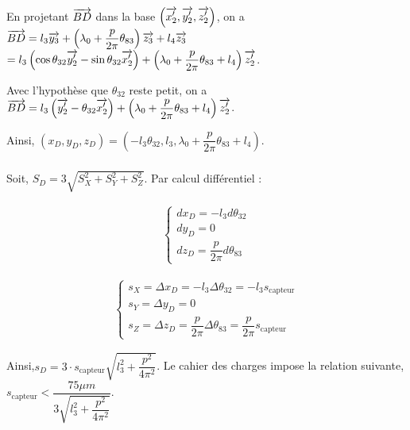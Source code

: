 \documentclass[10pt,fleqn]{article} %
\begin{document}


En projetant $\overrightarrow{BD}$ dans la base $\left(\overrightarrow{x_2'},\overrightarrow{y_2'},\overrightarrow{z_2'} \right)$, on a 
 $\overrightarrow{BD}=l_3\overrightarrow{y_3}+\left( \lambda_0 + \dfrac{p}{2\pi} \theta_{83} \right)\overrightarrow{z_3}+l_4\overrightarrow{z_3}$
 $ =l_3\left( \cos \theta_{32} \overrightarrow{y_2'} - \sin\theta_{32} \overrightarrow{x_2'}  \right)+\left( \lambda_0 + \dfrac{p}{2\pi} \theta_{83} +l_4\right)\overrightarrow{z_2'}$.
 
 Avec l'hypothèse que $\theta_{32}$ reste petit, on a  $\overrightarrow{BD}=l_3\left(  \overrightarrow{y_2'} - \theta_{32} \overrightarrow{x_2'}  \right)+\left( \lambda_0 + \dfrac{p}{2\pi} \theta_{83} +l_4\right)\overrightarrow{z_2'}$.
 
  Ainsi, $\left(x_D,y_D,z_D\right)=
\left(-l_3 \theta_{32},l_3, \lambda_0 + \dfrac{p}{2\pi} \theta_{83} +l_4\right)$.

\subparagraph{}%

Soit, $S_D=3\sqrt{S_X^2+S_Y^2+S_Z^2}$. Par calcul différentiel :  

\begin{minipage}{0.5\textwidth}
\begin{align*}
\left\{
\begin{array}{c}
dx_D=-l_3d\theta_{32}\\
dy_D=0\\
dz_D=\dfrac{p}{2\pi}d\theta_{83}
\end{array}
\right.
\end{align*}
\end{minipage}
\begin{minipage}{0.5\textwidth}

\begin{align*}
\left\{
\begin{array}{c}
s_X=\Delta x_D=-l_3\Delta \theta_{32}=-l_3 s_{\text{capteur}}\\
s_Y=\Delta y_D=0\\
s_Z=\Delta z_D=\dfrac{p}{2\pi}\Delta \theta_{83}=\dfrac{p}{2\pi}s_{\text{capteur}}
\end{array}
\right.
\end{align*}
\end{minipage}

Ainsi,$
s_D=3\cdot s_{\text{capteur}}\sqrt{l_3^2+\dfrac{p^2}{4\pi^2}}
$.
Le cahier des charges impose la relation suivante,$
s_{\text{capteur}}<\dfrac{75\mu m}{3\sqrt{l_3^2+\dfrac{p^2}{4\pi^2}}}
$.
\end{document}
